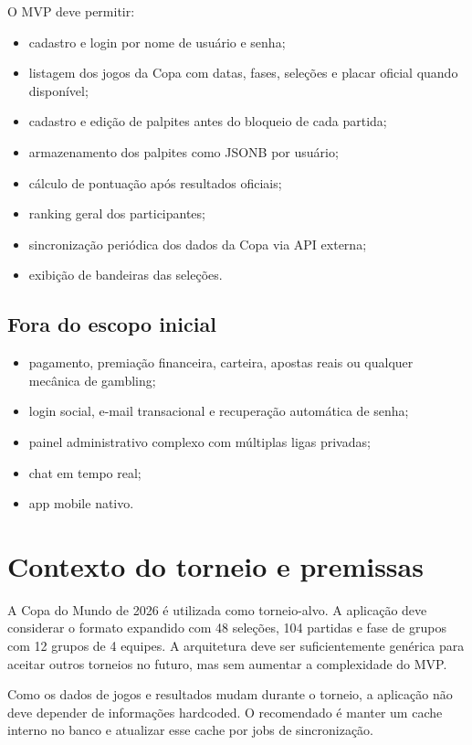 \documentclass[12pt,a4paper]{article}
\begin{document}
O MVP deve permitir:
\begin{itemize}
  \item cadastro e login por nome de usuário e senha;
  \item listagem dos jogos da Copa com datas, fases, seleções e placar oficial quando disponível;
  \item cadastro e edição de palpites antes do bloqueio de cada partida;
  \item armazenamento dos palpites como JSONB por usuário;
  \item cálculo de pontuação após resultados oficiais;
  \item ranking geral dos participantes;
  \item sincronização periódica dos dados da Copa via API externa;
  \item exibição de bandeiras das seleções.
\end{itemize}

\subsection{Fora do escopo inicial}

\begin{itemize}
  \item pagamento, premiação financeira, carteira, apostas reais ou qualquer mecânica de gambling;
  \item login social, e-mail transacional e recuperação automática de senha;
  \item painel administrativo complexo com múltiplas ligas privadas;
  \item chat em tempo real;
  \item app mobile nativo.
\end{itemize}

\section{Contexto do torneio e premissas}

A Copa do Mundo de 2026 é utilizada como torneio-alvo. A aplicação deve considerar o formato expandido com 48 seleções, 104 partidas e fase de grupos com 12 grupos de 4 equipes. A arquitetura deve ser suficientemente genérica para aceitar outros torneios no futuro, mas sem aumentar a complexidade do MVP.

\begin{notebox}
Como os dados de jogos e resultados mudam durante o torneio, a aplicação não deve depender de informações hardcoded. O recomendado é manter um cache interno no banco e atualizar esse cache por jobs de sincronização.
\end{notebox}
\end{document}
